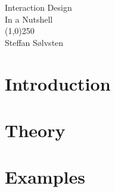 \documentclass[a4, english, twoside]{article}
\begin{document}

\thispagestyle{empty} %
\begin{center}
	\phantom{}\vspace{3.1cm}
	{\Huge\sc Interaction Design}
	\\ \vspace{1em}
	{\LARGE\sc In a Nutshell}
	\\
	\line(1,0){250}
	\\ \vspace{1em}
	{\LARGE Steffan Sølvsten}
\end{center}

\BgThispage

\newpage


\newpage
\thispagestyle{empty} %
\tableofcontents

\newpage
\section{Introduction}
\label{sec:introduction}



\newpage
\setcounter{page}{1}

\section{Theory}
\label{sec:1}













\newpage
\section{Examples}
\label{sec:2}
\end{document}
